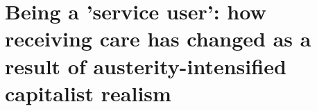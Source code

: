 


\section{Being a 'service user': how receiving care has changed as a result of austerity-intensified capitalist realism}

